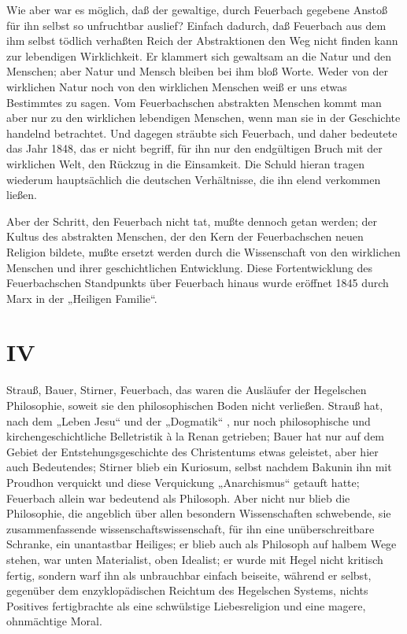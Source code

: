 Wie aber war es möglich, daß der gewaltige, durch Feuerbach
gegebene Anstoß für ihn selbst so unfruchtbar auslief? Einfach dadurch,
daß Feuerbach aus dem ihm selbst tödlich verhaßten Reich der
Abstraktionen den Weg nicht finden kann zur lebendigen Wirklichkeit. Er
klammert sich gewaltsam an die Natur und den Menschen; aber Natur und
Mensch bleiben bei ihm bloß Worte. Weder von der wirklichen Natur noch
von den wirklichen Menschen weiß er uns etwas Bestimmtes zu sagen. Vom
Feuerbachschen abstrakten Menschen kommt man aber nur zu den wirklichen
lebendigen Menschen, wenn man sie in der Geschichte handelnd betrachtet.
Und dagegen sträubte sich Feuerbach, und daher bedeutete das Jahr 1848,
das er nicht begriff, für ihn nur den endgültigen Bruch mit der
wirklichen Welt, den Rückzug in die Einsamkeit. Die Schuld hieran tragen
wiederum hauptsächlich die deutschen Verhältnisse, die ihn elend
verkommen ließen.

Aber der Schritt, den Feuerbach nicht tat, mußte dennoch getan
werden; der Kultus des abstrakten Menschen, der den Kern der
Feuerbachschen neuen Religion bildete, mußte ersetzt werden durch die
Wissenschaft von den wirklichen Menschen und ihrer geschichtlichen
Entwicklung. Diese Fortentwicklung des Feuerbachschen Standpunkts über
Feuerbach hinaus wurde eröffnet 1845 durch Marx in der „Heiligen
Familie``.

\quebra

\mbox{}
\vspace{2cm}

\section{IV}


\noindent{}Strauß, Bauer, Stirner, Feuerbach, das waren die Ausläufer der
Hegelschen Philosophie, soweit sie den philosophischen Boden nicht
verließen. Strauß hat, nach dem „Leben Jesu`` \textbar{} und der „Dogmatik`` \textbar{}, nur
noch philosophische und kirchengeschichtliche Belletristik à la Renan
getrieben; Bauer hat nur auf dem Gebiet der Entstehungsgeschichte des
Christentums etwas geleistet, aber hier auch Bedeutendes; Stirner blieb
ein Kuriosum, selbst nachdem Bakunin ihn mit Proudhon verquickt und
diese Verquickung „Anarchismus`` getauft hatte; Feuerbach allein war
bedeutend als Philosoph. Aber nicht nur blieb die Philosophie, die
angeblich über allen besondern Wissenschaften schwebende, sie
zusammenfassende wissenschaftswissenschaft, für ihn eine
unüberschreitbare Schranke, ein unantastbar Heiliges; er blieb auch als
Philosoph auf halbem Wege stehen, war unten Materialist, oben Idealist;
er wurde mit Hegel nicht kritisch fertig, sondern warf ihn als
unbrauchbar einfach beiseite, während er selbst, gegenüber dem
enzyklopädischen Reichtum des Hegelschen Systems, nichts Positives
fertigbrachte als eine schwülstige Liebesreligion und eine magere,
ohnmächtige Moral.

